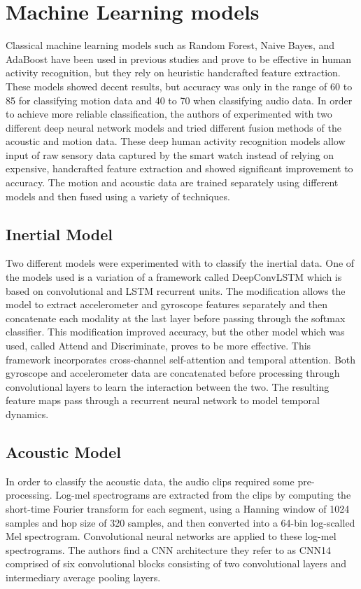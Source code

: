 \documentclass[conference]{IEEEtran}
\begin{document}
	\section{Machine Learning models}
	Classical machine learning models such as Random Forest, Naive Bayes, and AdaBoost have been used in previous studies and prove to be effective in human activity recognition, but they rely on heuristic handcrafted feature extraction. These models showed decent results, but accuracy was only in the range of 60 to 85 for classifying motion data and 40 to 70 when classifying audio data. In order to achieve more reliable classification, the authors of \cite{2022_Leveraging_sound} experimented with two different deep neural network models and tried different fusion methods of the acoustic and motion data. These deep human activity recognition models allow input of raw sensory data captured by the smart watch instead of relying on expensive, handcrafted feature extraction and showed significant improvement to accuracy. The motion and acoustic data are trained separately using different models and then fused using a variety of techniques.
	
	\subsection{Inertial Model}
	Two different models were experimented with to classify the inertial data. One of the models used is a variation of a framework called DeepConvLSTM which is based on convolutional and LSTM recurrent units. The modification allows the model to extract accelerometer and gyroscope features separately and then concatenate each modality at the last layer before passing through the softmax classifier. This modification improved accuracy, but the other model which was used, called Attend and Discriminate, proves to be more effective. This framework incorporates cross-channel self-attention and temporal attention. Both gyroscope and accelerometer data are concatenated before processing through convolutional layers to learn the interaction between the two. The resulting feature maps pass through a recurrent neural network to model temporal dynamics.
	
	\subsection{Acoustic Model}
	In order to classify the acoustic data, the audio clips required some pre-processing. Log-mel spectrograms are extracted from the clips by computing the short-time Fourier transform for each segment, using a Hanning window of 1024 samples and hop size of 320 samples, and then converted into a 64-bin log-scalled Mel spectrogram.  Convolutional neural networks are applied to these log-mel spectrograms. The authors find a CNN architecture they refer  to as CNN14 comprised of six convolutional blocks consisting of two convolutional layers and intermediary average pooling layers.
	
\end{document}
